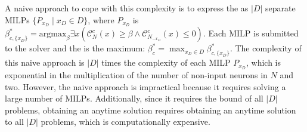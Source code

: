 A naive approach to cope with this complexity is to express the \propa as $|D|$ separate MILPs $\{P_{x_D} \mid x_D \in D \}$, where $P_{x_D}$ is
$\beta_{c,\{x_D\}}^*=\text{argmax}_{\beta} \exists x 
\left(\mathcal{C}_{N}^c(x) \geq \beta \land \mathcal{C}_{N_{-{x_D}}}^c(x) \leq 0\right )$.
Each MILP is submitted to the solver and the \propa is the maximum: $\beta_c^* = \max_{x_D\in D}\beta^*_{c,\{x_D\}}$. 
The complexity of this naive approach is $|D|$ times the complexity of each MILP $P_{x_D}$, which is exponential in the multiplication of the number of non-input neurons in $N$ and two.
%
However, the naive approach is impractical because it requires solving a large number of MILPs. Additionally, since it requires the bound of all $|D|$ problems, %
obtaining an anytime solution requires obtaining an anytime solution to all $|D|$ problems, which is computationally expensive. %

